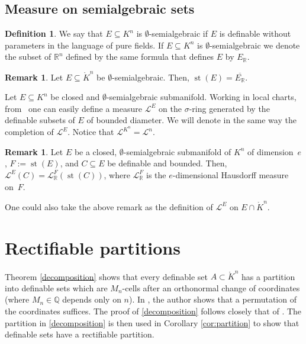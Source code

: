 \documentclass[a4paper, 12pt, final]{article}
\newtheorem{open problem}[lem]{Open problem}
\theoremstyle{remark}
\theoremstyle{definition}
\newtheorem{dfn}[lem]{Definition}
\newtheorem{rem}[lem]{Remark}
\newtheorem{final remark}[lem]{Final remark}
\begin{document}
\subsection{Measure on semialgebraic sets}
\label{sec:algebraic-measure}
\begin{dfn}
We say that $E \subseteq {K}^n$ is {$\emptyset$-semialgebraic\xspace} if $E$ is definable without
parameters in the language of pure fields.  
If $E \subseteq {K}^n$ is {$\emptyset$-semialgebraic\xspace}
we denote the subset of ${\mathbb{R}}^n$ defined by the same formula that defines  $E$ by $E_{\mathbb{R}}$. 
\end{dfn}
\begin{rem}
Let $E \subseteq {\mathring {K}}^n$ be {$\emptyset$-semialgebraic\xspace}.
Then, $\operatorname{st}(E) = {\overline{{E_{\mathbb{R}}}}}$.
\end{rem}

Let $E \subseteq {K}^n$ be closed and {$\emptyset$-semialgebraic\xspace} submanifold.
Working in local charts, from~\cite{bo} one can easily define a measure ${\mathcal L^E}$
on the $\sigma$-ring generated by the definable subsets of $E$ of bounded
diameter. 
We will denote in the same way the completion of ${\mathcal L^E}$.
Notice that ${\mathcal L}^{{K}^n}= {{\mathcal L}^n}$.

\begin{rem}
Let $E$ be a closed, {$\emptyset$-semialgebraic\xspace} submanifold of ${K}^n$ 
of dimension~$e$, $F := \operatorname{st}(E)$, and $C \subseteq E$ be definable and bounded.
Then, ${\mathcal L^E}(C) = {\mathcal L}_{\mathbb{R}}^F(\operatorname{st}(C))$, where ${\mathcal L}_{\mathbb{R}}^F$ is the $e$-dimensional
Hausdorff measure on~$F$.
\end{rem}
One could also take the above remark as the definition of ${\mathcal L^E}$ 
on $E \cap {\mathring {K}}^n$.

\section{Rectifiable partitions}
\label{sec:partition}

Theorem \ref{decomposition} shows that every definable  set $A\subset{\mathring {K}}^n$
has a partition into definable sets which are $M_n$-cells after an orthonormal
change of coordinates (where $M_n\in{\mathbb{Q}}$ depends only on $n$). 
In \cite{pawlucki}, the author shows that a permutation of the coordinates suffices. The proof of \ref{decomposition} follows closely that of \cite{kurdyka}. The partition in \ref{decomposition} is  then used in Corollary \ref{cor:partition} to show that definable sets have a rectifiable partition.
\end{document}
